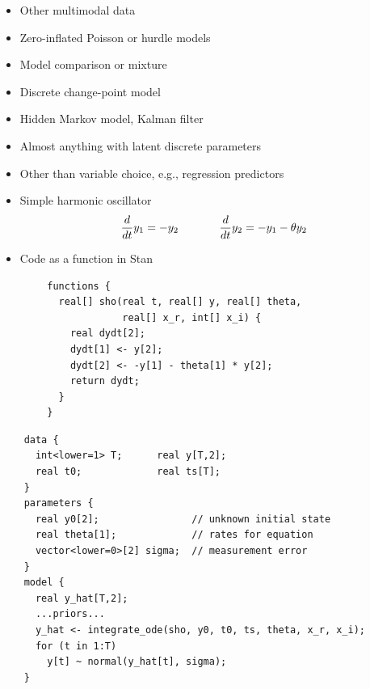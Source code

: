 \documentclass[10pt]{report}
\begin{document}
%
\begin{itemize}
\item Other multimodal data
\item Zero-inflated Poisson or hurdle models
\item Model comparison or mixture
\item Discrete change-point model
\item Hidden Markov model, Kalman filter
\item Almost anything with latent discrete parameters
\hfill
\item Other than variable choice, e.g., regression predictors
\end{itemize}


%
\begin{itemize}
\item Simple harmonic oscillator
{\small
\begin{equation*}
\frac{d}{dt} y_1 = -y_2
\hspace*{0.5in}
\frac{d}{dt} y_2 = -y_1 - \theta y_2
\end{equation*}
}
\item Code as a function in Stan
\end{itemize}
{\footnotesize
\begin{Verbatim}
        functions {
          real[] sho(real t, real[] y, real[] theta,
                     real[] x_r, int[] x_i) {
            real dydt[2];
            dydt[1] <- y[2];
            dydt[2] <- -y[1] - theta[1] * y[2];
            return dydt;
          }
        }
\end{Verbatim}
}


%
{\footnotesize
\begin{Verbatim}
    data {
      int<lower=1> T;      real y[T,2];
      real t0;             real ts[T];
    }
    parameters {
      real y0[2];                // unknown initial state
      real theta[1];             // rates for equation
      vector<lower=0>[2] sigma;  // measurement error
    }
    model {
      real y_hat[T,2];
      ...priors...
      y_hat <- integrate_ode(sho, y0, t0, ts, theta, x_r, x_i);
      for (t in 1:T)
        y[t] ~ normal(y_hat[t], sigma);
    }
\end{Verbatim}
}
\end{document}
